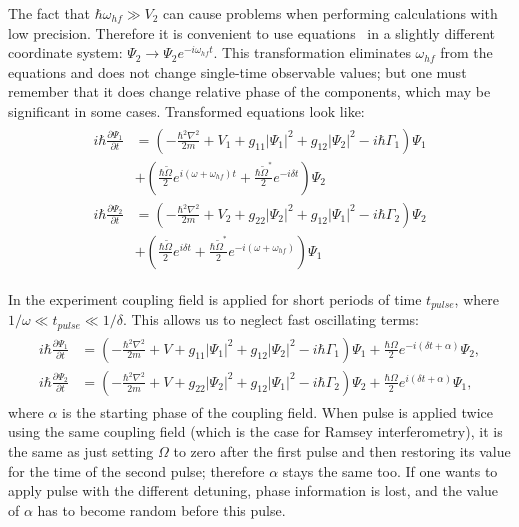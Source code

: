 The fact that $\hbar \omega_{hf} \gg V_2$ can cause problems when performing calculations with low precision.
Therefore it is convenient to use equations~
in a slightly different coordinate system:
$\Psi_2 \rightarrow \Psi_2 e^{-i \omega_{hf} t}$.
This transformation eliminates $\omega_{hf}$ from the equations and does not change single-time observable values;
but one must remember that it does change relative phase of the components,
which may be significant in some cases.
Transformed equations look like:
\begin{align*}
\begin{split}
	i \hbar \frac{\partial \Psi_1}{\partial t} & = \left(
		-\frac{\hbar^2 \nabla^2}{2 m} + V_1
		+ g_{11} \lvert \Psi_1 \rvert^2
		+ g_{12} \lvert \Psi_2 \rvert^2
		- i \hbar \Gamma_1
	\right) \Psi_1 \\
	& + \left(
		\frac{\hbar \tilde{\Omega}}{2} e^{i (\omega + \omega_{hf}) t}
		+ \frac{\hbar \tilde{\Omega}^*}{2} e^{-i \delta t}
	\right) \Psi_2 \\
	i \hbar \frac{\partial \Psi_2}{\partial t} & = \left(
		-\frac{\hbar^2 \nabla^2}{2 m} + V_2
		+ g_{22} \lvert \Psi_2 \rvert^2
		+ g_{12} \lvert \Psi_1 \rvert^2
		- i \hbar \Gamma_2
	\right) \Psi_2 \\
	& + \left(
		\frac{\hbar \tilde{\Omega}}{2} e^{i \delta t}
		+ \frac{\hbar \tilde{\Omega}^*}{2} e^{-i (\omega + \omega_{hf})}
	\right) \Psi_1
\end{split}
\end{align*}

In the experiment coupling field is applied for short periods of time $t_{pulse}$,
where $1 / \omega \ll t_{pulse} \ll 1 / \delta$.
This allows us to neglect fast oscillating terms:
\begin{align}
\label{eqn:mean-field:cgpes_simplified}
\begin{split}
	i \hbar \frac{\partial \Psi_1}{\partial t} & = \left(
		-\frac{\hbar^2 \nabla^2}{2 m} + V
		+ g_{11} \lvert \Psi_1 \rvert^2
		+ g_{12} \lvert \Psi_2 \rvert^2
		- i \hbar \Gamma_1
	\right) \Psi_1
	+ \frac{\hbar \Omega}{2} e^{-i (\delta t + \alpha)} \Psi_2, \\
	i \hbar \frac{\partial \Psi_2}{\partial t} & = \left(
		-\frac{\hbar^2 \nabla^2}{2 m} + V
		+ g_{22} \lvert \Psi_2 \rvert^2
		+ g_{12} \lvert \Psi_1 \rvert^2
		- i \hbar \Gamma_2
	\right) \Psi_2 +
	\frac{\hbar \Omega}{2} e^{i (\delta t + \alpha)} \Psi_1,
\end{split}
\end{align}
where $\alpha$ is the starting phase of the coupling field.
When pulse is applied twice using the same coupling field (which is the case for Ramsey interferometry),
it is the same as just setting $\Omega$ to zero after the first pulse and then restoring its value for the time of the second pulse;
therefore $\alpha$ stays the same too.
If one wants to apply pulse with the different detuning, phase information is lost,
and the value of $\alpha$ has to become random before this pulse.

